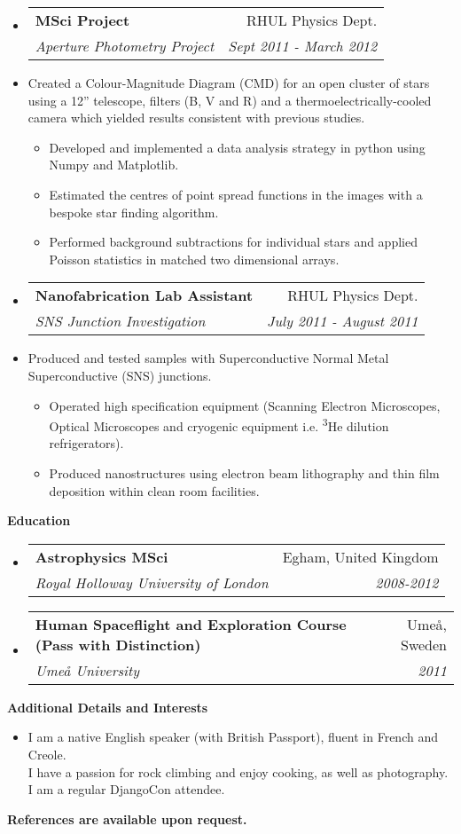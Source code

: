 \documentclass[letterpaper,11pt]{article}
\makeatletter
\newcommand{\resitem}[1]{\item #1 \vspace{-2pt}}
\newcommand{\resheading}[1]{{\large \colorbox{mygrey}
			{\begin{minipage}{\textwidth}
					{\textbf{#1 \vphantom{p\^{E}}}}
		\end{minipage}}}
	}
\newcommand{\ressubheading}[4]{
		\begin{tabular*}{180mm}{l@{\extracolsep{\fill}}r}
			\textbf{#1} & #2 \\
			\textit{#3} & \textit{#4} \\
		\end{tabular*}\vspace{-6pt}
	}
\newcommand{\resdescription}[1]{#1 \vspace{-0mm}}
\makeatother
\begin{document}
\begin{itemize}
		\item[]
			\ressubheading{MSci Project}{RHUL Physics Dept.}{Aperture Photometry Project}{Sept 2011 - March 2012}
		\item[]
			\resdescription{Created a Colour-Magnitude Diagram (CMD) for an open cluster of stars using a 12'' telescope, filters (B, V and R) and a thermoelectrically-cooled camera which yielded results consistent with previous studies.}
			\begin{itemize}
					\resitem{Developed and implemented a data analysis strategy in python using Numpy and Matplotlib.}
					\resitem{Estimated the centres of point spread functions in the images with a bespoke star finding algorithm.}
					\resitem{Performed background subtractions for individual stars and applied Poisson statistics in matched two dimensional arrays.}
			\end{itemize}

		\item[]
			\ressubheading{Nanofabrication Lab Assistant}{RHUL Physics Dept.}{SNS Junction Investigation}{July 2011 - August 2011}
		\item[]
			\resdescription{Produced and tested samples with Superconductive Normal Metal Superconductive (SNS) junctions.}
			\begin{itemize}
					\resitem{Operated high specification equipment (Scanning Electron Microscopes, Optical Microscopes and cryogenic equipment i.e. \textsuperscript{3}He dilution refrigerators).}
					\resitem{Produced nanostructures using electron beam lithography and thin film deposition within clean room facilities.}
			\end{itemize}

	\end{itemize}

	\resheading{Education}
	\begin{itemize}
		\item[]
			\ressubheading{Astrophysics MSci }{Egham, United Kingdom}{Royal Holloway University of London}{2008-2012}

		\item[]
			\ressubheading{Human Spaceflight and Exploration Course (Pass with Distinction)}{Ume\r{a}, Sweden}{Ume\r{a} University}{2011}

	\end{itemize}

	\resheading{Additional Details and Interests}
	\begin{itemize}
		\item[] I am a native English speaker (with British Passport), fluent in French and Creole.\\
			I have a passion for rock climbing and enjoy cooking, as well as photography. \\
			I am a regular DjangoCon attendee.\\
	\end{itemize}

	\textbf{References are available upon request.}

	
\end{document}
